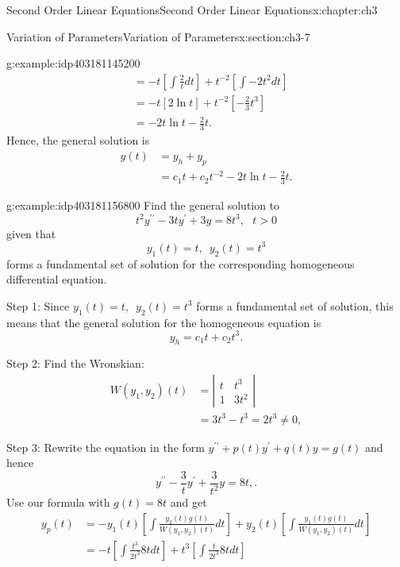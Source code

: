 \documentclass[oneside,10pt,]{book}
\numberwithin{equation}{section}
\numberwithin{equation}{section}
\newcommand{\amp}{&}
\begin{document}
\begin{chapterptx}{Second Order Linear Equations}{}{Second Order Linear Equations}{}{}{x:chapter:ch3}
\begin{sectionptx}{Variation of Parameters}{}{Variation of Parameters}{}{}{x:section:ch3-7}
\begin{example}{}{g:example:idp403181145200}
\begin{align*}
\amp =-t\left[\int\frac{2}{t}dt\right]+t^{-2}\left[\int-2t^{2}dt\right]\\
\amp =-t\left[2\ln t\right]+t^{-2}\left[-\frac{2}{3}t^{3}\right]\\
\amp =-2t\ln t-\frac{2}{3}t.
\end{align*}
Hence, the general solution is%
\begin{align*}
y(t) \amp =y_{h}+y_{p}\\
\amp =c_{1}t+c_{2}t^{-2}-2t\ln t-\frac{2}{3}t.
\end{align*}
%
\end{example}
\begin{example}{}{g:example:idp403181156800}%
Find the general solution to%
\begin{equation*}
t^{2}y^{\prime\prime}-3ty^{\prime}+3y=8t^{3},\,\,\,\,t>0
\end{equation*}
given that%
\begin{equation*}
y_{1}(t)=t,\,\,\,y_{2}(t)=t^{3}
\end{equation*}
forms a fundamental set of solution for the corresponding homogeneous differential equation.%
\par
Step 1: Since \(y_{1}(t)=t,\,\,\,y_{2}(t)=t^{3}\) forms a fundamental set of solution, this means that the general solution for the homogeneous equation is%
\begin{equation*}
y_{h}=c_{1}t+c_{2}t^{3}.
\end{equation*}
%
\par
Step 2: Find the Wronskian:%
\begin{align*}
W(y_{1},y_{2})(t) \amp =\left|\begin{array}{cc}
t \amp t^{3}\\
1 \amp 3t^{2}
\end{array}\right|\\
\amp =3t^{3}-t^{3}=2t^{3}\neq0,
\end{align*}
%
\par
Step 3: Rewrite the equation in the form \(y^{\prime\prime}+p(t)y^{\prime}+q(t)y=g(t)\) and hence%
\begin{equation*}
y^{\prime\prime}-\frac{3}{t}y^{\prime}+\frac{3}{t^{2}}y=8t,.
\end{equation*}
Use our formula with \(g(t)=8t\) and get%
\begin{align*}
y_{p}(t) \amp =-y_{1}(t)\left[\int\frac{y_{2}(t)g(t)}{W\left(y_{1},y_{2}\right)(t)}dt\right]+y_{2}(t)\left[\int\frac{y_{1}(t)g(t)}{W\left(y_{1},y_{2}\right)(t)}dt\right]\\
\amp =-t\left[\int\frac{t^{3}}{2t^{3}}8tdt\right]+t^{3}\left[\int\frac{t}{2t^{3}}8tdt\right]\\

\end{align*}
\end{example}
\end{sectionptx}
\end{chapterptx}
\end{document}

